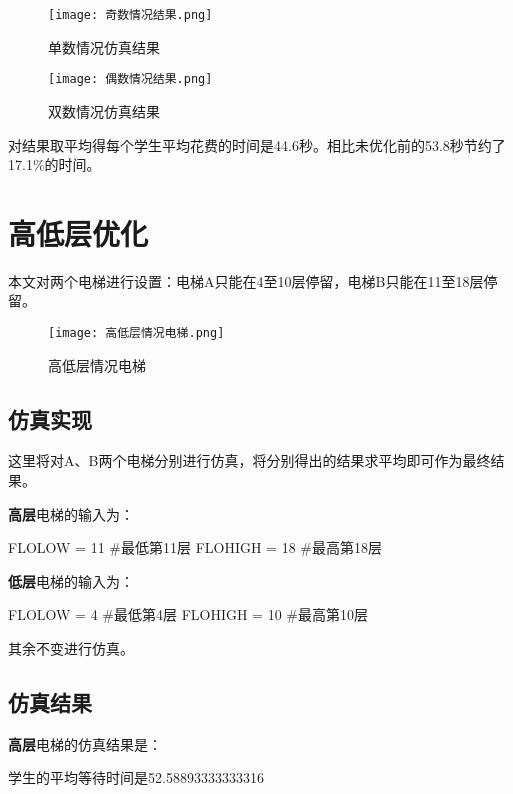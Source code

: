 \documentclass[letterpaper,12pt]{article}
\begin{document}
\begin{figure}[H]
\begin{minipage}[t]{0.5\linewidth}
\centering
\texttt{[image: 奇数情况结果.png]}
\caption{单数情况仿真结果}
\label{单数情况仿真结果}
\end{minipage}%
\begin{minipage}[t]{0.5\linewidth}
\centering
\texttt{[image: 偶数情况结果.png]}
\caption{双数情况仿真结果}
\label{双数情况仿真结果}
\end{minipage}
\end{figure}

对结果取平均得每个学生平均花费的时间是44.6秒。相比未优化前的53.8秒节约了17.1\%的时间。


\section{高低层优化}\label{高低层优化}
本文对两个电梯进行设置：电梯A只能在4至10层停留，电梯B只能在11至18层停留。

\begin{figure}[H]

\centering
\texttt{[image: 高低层情况电梯.png]}
\caption{高低层情况电梯}
\label{fig:高低层情况电梯}
 
\end{figure}

\subsection{仿真实现}
这里将对A、B两个电梯分别进行仿真，将分别得出的结果求平均即可作为最终结果。

\textbf{高层}电梯的输入为：
\begin{python}
FLOLOW = 11 #最低第11层
FLOHIGH = 18 #最高第18层
\end{python}


\textbf{低层}电梯的输入为：
\begin{python}
FLOLOW = 4 #最低第4层
FLOHIGH = 10 #最高第10层
\end{python}

其余不变进行仿真。

\subsection{仿真结果}

\textbf{高层}电梯的仿真结果是：
\begin{python}
学生的平均等待时间是52.58893333333316
\end{python}
\end{document}
